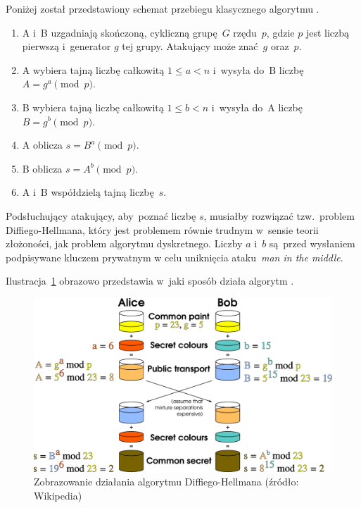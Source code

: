 \documentclass[thesis]{subfiles}
\begin{document}
Poniżej został przedstawiony schemat przebiegu klasycznego algorytmu .

\begin{enumerate}
\item A i~B uzgadniają skończoną, cykliczną grupę~$G$ rzędu~$p$, gdzie $p$ jest liczbą pierwszą i~generator $g$ tej grupy. Atakujący może znać~$g$ oraz~$p$.
\item A wybiera tajną liczbę całkowitą $1 \leq a < n$ i~wysyła do~B liczbę $A=g^a \pmod{p}$.
\item B wybiera tajną liczbę całkowitą $1 \leq b < n$ i~wysyła do~A liczbę $B=g^b \pmod{p}$.
\item A oblicza $s=B^a \pmod{p}$.
\item B oblicza $s=A^b \pmod{p}$.
\item A i~B współdzielą tajną liczbę~$s$.
\end{enumerate}

Podsłuchujący atakujący, aby~poznać liczbę $s$, musiałby rozwiązać tzw.~problem Diffiego-Hellmana, który jest problemem równie trudnym w~sensie teorii złożoności, jak problem algorytmu dyskretnego. Liczby $a$ i~$b$ są~przed wysłaniem podpisywane kluczem prywatnym w celu uniknięcia ataku~\emph{man in the middle}.

Ilustracja~\ref{fig:dh} obrazowo przedstawia w~jaki sposób działa algorytm .

\begin{figure}[hb]
	\centering
	\includegraphics[width=\textwidth]{img/Diffie-Hellman_Key_Exchange_desc}
	\caption{Zobrazowanie działania algorytmu Diffiego-Hellmana (źródło: Wikipedia)}
	\label{fig:dh}
\end{figure}

\end{document}
